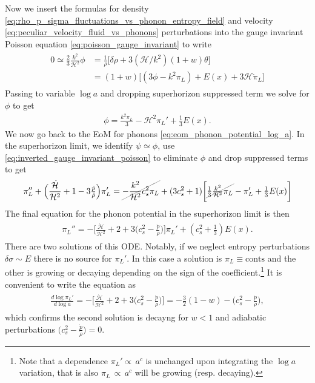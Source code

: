 Now we insert the formulas for density \eqref{eq:rho_p_sigma_fluctuations_vs_phonon_entropy_field} and velocity \eqref{eq:peculiar_velocity_fluid_vs_phonons} perturbations into the gauge invariant Poisson equation \eqref{eq:poisson_gauge_invariant} to write
{\small\begin{align}
\begin{aligned}
    0\simeq \tfrac23 \tfrac{k^2}{\mathcal{H}^2} \phi&=\frac{1}{\rho}\Big[\delta\rho+3(\mathcal{H}/k^2)(1+w)\theta\Big]\\
    &=(1+w)\big[(3\phi-k^2\pi_L)+E(x)+3\mathcal{H}\dot{\pi}_L\big]
\end{aligned}\end{align}}
Passing to variable $\log a$ and dropping superhorizon suppressed term we solve for $\phi$ to get
\begin{align}\label{eq:inverted_gauge_invariant_poisson}
    \phi=\frac{k^2\pi_L}{3}-\mathcal{H}^2\pi_L'+\tfrac13 E(x).
\end{align}
We now go back to the EoM for phonons \eqref{eq:eom_phonon_potential_log_a}.
In the superhorizon limit, we identify $\psi\simeq \phi$, use \eqref{eq:inverted_gauge_invariant_poisson} to eliminate $\phi$ and drop suppressed terms to get
{\small\begin{align}
\begin{aligned}
    \pi_L''+\Big(\frac{\dot{\mathcal{H}}}{\mathcal{H}^2}+1-3\tfrac{\dot{p}}{\dot{\rho}}\Big)\pi_L'= \graycancel{-\frac{k^2}{\mathcal{H}^2}c_s^2\pi_L}+(3c_s^2+1)\bigg[\graycancel{\tfrac13\tfrac{k^2}{\mathcal{H}^2}\pi_L}-\pi_L'+\tfrac13 E(x)\bigg]
\end{aligned}\end{align}}
The final equation for the phonon potential in the superhorizon limit is then
{\small\begin{align}\label{eq:superhorizon_phonon_potential}
\begin{aligned}
    \pi_L''=-\Big[\frac{\dot{\mathcal{H}}}{\mathcal{H}^2}+2+3\big(c_s^2-\tfrac{\dot{p}}{\dot{\rho}}\big)\Big]\pi_L' + (c_s^2+\tfrac13) E(x).
\end{aligned}\end{align}}
There are two solutions of this ODE.
Notably, if we neglect entropy perturbations $\delta\sigma\sim E$ there is no source for $\pi_L'$.
In this case a solution is $\pi_L\equiv\text{conts}$ and the other is growing or decaying depending on the sign of the coefficient.\footnote{Note that a dependence $\pi_L'\propto\, a^{c}$ is unchanged upon integrating the $\log a$ variation, that is also $\pi_L\, \propto\, a^{c}$ will be growing (resp. decaying).}
It is convenient to write the equation as 
{\small\begin{align}
\begin{aligned}
    \frac{d\log \pi_L'}{d\log a}=-\Big[\frac{\dot{\mathcal{H}}}{\mathcal{H}^2}+2+3\big(c_s^2-\tfrac{\dot{p}}{\dot{\rho}}\big)\Big]= -\tfrac32(1-w)-\big(c_s^2-\tfrac{\dot{p}}{\dot{\rho}}\big),
\end{aligned}\end{align}}
which confirms the second solution is decayng for $w<1$ and adiabatic perturbations $\big(c_s^2-\tfrac{\dot{p}}{\dot{\rho}}\big)=0$.

